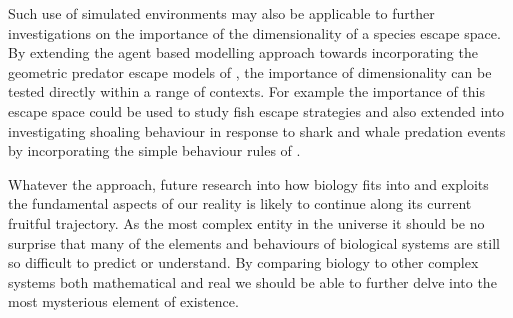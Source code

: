Such use of simulated environments may also be applicable to further investigations on the importance of the dimensionality of a species escape space. By extending the agent based modelling approach towards incorporating the geometric predator escape models of \cite{howland1974optimal}, the importance of dimensionality can be tested directly within a range of contexts. For example the importance of this escape space could be used to study fish escape strategies \citep{domenici1997kinematics} and also extended into investigating shoaling behaviour in response to shark and whale predation events by incorporating the simple behaviour rules of \cite{couzin2002collective}.


Whatever the approach, future research into how biology fits into and exploits the fundamental aspects of our reality is likely to continue along its current fruitful trajectory. As the most complex entity in the universe it should be no surprise that many of the elements and behaviours of biological systems are still so difficult to predict or understand. By comparing biology to other complex systems both mathematical and real we should be able to further delve into the most mysterious element of existence.









